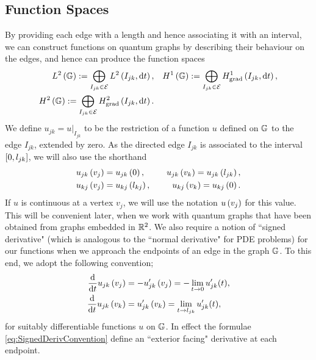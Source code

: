 \subsection{Function Spaces} \label{ssec:FunctionSpaces}
By providing each edge with a length and hence associating it with an interval, we can construct functions on quantum graphs by describing their behaviour on the edges, and hence can produce the function spaces
\begin{subequations} \label{eq:GraphFuncSpaces}
	\begin{align}
		L^2\left( \mathbb{G} \right) := \bigoplus_{I_{jk}\in \mathcal{E}} L^{2}\left( I_{jk},\mathrm{d}t \right),
		&\quad H^1\left( \mathbb{G} \right) := \bigoplus_{I_{jk}\in \mathcal{E}} H^1_\mathrm{grad}\left( I_{jk}, \mathrm{d}t \right), \\
		H^2\left( \mathbb{G} \right) := \bigoplus_{I_{jk}\in \mathcal{E}} H^2_\mathrm{grad}\left( I_{jk}, \mathrm{d} t \right). &
	\end{align}
\end{subequations}
We define $u_{jk} = u\vert_{I_{jk}}$ to be the restriction of a function $u$ defined on $\mathbb{G}$ to the edge $I_{jk}$, extended by zero.
As the directed edge $I_{jk}$ is associated to the interval $\left[ 0,l_{jk} \right]$, we will also use the shorthand
\begin{align*}
	u_{jk}\left( v_j \right) &= u_{jk}\left( 0 \right), &\quad
	u_{jk}\left( v_k \right) = u_{jk}\left( l_{jk} \right), \\
	u_{kj}\left( v_j \right) &= u_{kj}\left( l_{kj} \right), &\quad
	u_{kj}\left( v_k \right) = u_{kj}\left( 0 \right).
\end{align*}
If $u$ is continuous at a vertex $v_j$, we will use the notation $u\left( v_j \right)$ for this value.
This will be convenient later, when we work with quantum graphs that have been obtained from graphs embedded in $\mathbb{R}^2$.
We also require a notion of ``signed derivative" (which is analogous to the ``normal derivative" for PDE problems) for our functions when we approach the endpoints of an edge in the graph $\mathbb{G}$.
To this end, we adopt the following convention;
\begin{subequations} \label{eq:SignedDerivConvention}
	\begin{align}
		\dfrac{\mathrm{d}}{\mathrm{d}t}u_{jk}\left( v_j \right) &= -u_{jk}'\left( v_j \right) = -\lim_{t\rightarrow0}u_{jk}'(t), \\
		\dfrac{\mathrm{d}}{\mathrm{d}t}u_{jk}\left( v_k \right) &= u_{jk}'\left( v_k \right) = \lim_{t\rightarrow l_{jk}}u_{jk}'(t),
	\end{align}
\end{subequations}
for suitably differentiable functions $u$ on $\mathbb{G}$. 
In effect the formulae \eqref{eq:SignedDerivConvention} define an ``exterior facing" derivative at each endpoint. \newline
 
